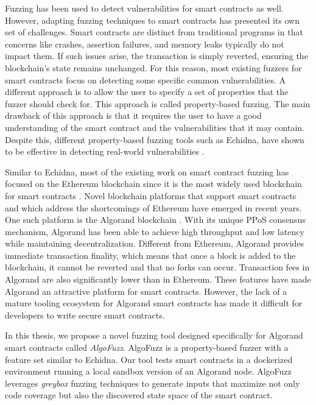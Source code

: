 Fuzzing has been used to detect vulnerabilities for smart contracts as well.
However, adapting fuzzing techniques to smart contracts has presented its own set of challenges.
Smart contracts are distinct from traditional programs in that concerns like crashes, assertion failures, and memory leaks typically do not impact them. If such issues arise, the transaction is simply reverted, ensuring the blockchain's state remains unchanged.
For this reason, most existing fuzzers for smart contracts focus on detecting some specific common vulnerabilities.
A different approach is to allow the user to specify a set of properties that the fuzzer should check for.
This approach is called property-based fuzzing.
The main drawback of this approach is that it requires the user to have a good understanding of the smart contract and the vulnerabilities that it may contain.
Despite this, different property-based fuzzing tools such as Echidna, have shown to be effective in detecting real-world vulnerabilities \cite{grieco_echidna_2020, noauthor_echidna_nodate}.

Similar to Echidna, most of the existing work on smart contract fuzzing has focused on the Ethereum blockchain since it is the most widely used blockchain for smart contracts \cite{guo_analysis_2022}.
Novel blockchain platforms that support smart contracts and which address the shortcomings of Ethereum have emerged in recent years.
One such platform is the Algorand blockchain \cite{chen_algorand_2019}.
With its unique \ac{PPoS} consensus mechanism, Algorand has been able to achieve high throughput and low latency while maintaining decentralization.
Different from Ethereum, Algorand provides immediate transaction finality, which means that once a block is added to the blockchain, it cannot be reverted and that no forks can occur.
Transaction fees in Algorand are also significantly lower than in Ethereum.
These features have made Algorand an attractive platform for smart contracts.
However, the lack of a mature tooling ecosystem for Algorand smart contracts has made it difficult for developers to write secure smart contracts.

In this thesis, we propose a novel fuzzing tool designed specifically for Algorand smart contracts called \textit{AlgoFuzz}.
AlgoFuzz is a property-based fuzzer with a feature set similar to Echidna.
Our tool tests smart contracts in a dockerized environment running a local sandbox version of an Algorand node.
AlgoFuzz leverages \textit{greybox} fuzzing techniques to generate inputs that maximize not only code coverage but also the discovered state space of the smart contract.

